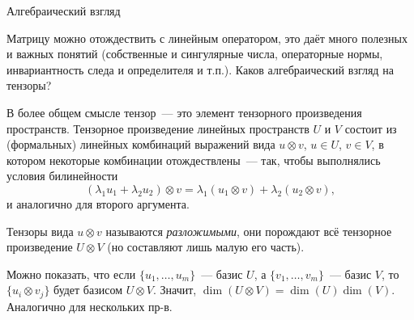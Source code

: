 \documentclass[handout]{beamer}
\begin{document}
\begin{frame}{Алгебраический взгляд}

    Матрицу можно отождествить с линейным оператором, это даёт много полезных и
    важных понятий (собственные и сингулярные числа, операторные нормы, инвариантность следа и
    определителя и т.п.). Каков алгебраический взгляд на тензоры?
    \pause\vspace{5pt}

    В более общем смысле тензор~--- это элемент тензорного произведения
    пространств. Тензорное произведение линейных пространств $U$ и $V$ состоит
    из (формальных) линейных комбинаций выражений вида $u\otimes v$, $u\in U$, $v\in V$, в
    котором некоторые комбинации отождествлены~--- так, чтобы выполнялись
    условия билинейности
    $$
    (\lambda_1 u_1+\lambda_2 u_2)\otimes v = \lambda_1 (u_1\otimes v) +
    \lambda_2 (u_2 \otimes v),
    $$
    и аналогично для второго аргумента.
    \pause

    Тензоры вида $u\otimes v$ называются \textit{разложимыми}, они порождают всё
    тензорное произведение $U\otimes V$ (но составляют лишь малую его часть).
    \pause

    Можно показать, что если $\{u_1,\ldots,u_m\}$~--- базис $U$, а
    $\{v_1,\ldots,v_m\}$~--- базис $V$, то $\{u_i\otimes v_j\}$ будет базисом
    $U\otimes V$. Значит, $\dim(U\otimes V)=\dim(U)\dim(V)$. Аналогично
    для нескольких пр-в.
\end{frame}
\end{document}
